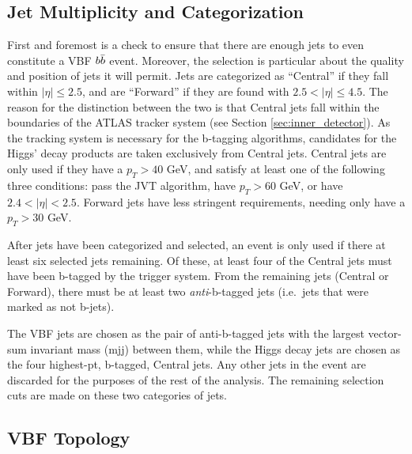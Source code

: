     \subsection{Jet Multiplicity and Categorization}
        
        First and foremost is a check to ensure that there are enough jets to even constitute a VBF \to $b \bar{b}$ event.
        Moreover, the selection is particular about the quality and position of jets it will permit.
        Jets are categorized as ``Central'' if they fall within $|\eta| \leq 2.5$,
            and are ``Forward'' if they are found with $ 2.5 < |\eta| \leq 4.5 $.
        The reason for the distinction between the two is that Central jets fall within the boundaries of the ATLAS tracker system
            (see Section \ref{sec:inner_detector}).
        As the tracking system is necessary for the b-tagging algorithms,
            candidates for the Higgs' decay products are taken exclusively from Central jets.
        Central jets are only used if they have a $p_T > 40$ GeV, and satisfy at least one of the following three conditions:
            pass the JVT algorithm, have $p_T > 60$ GeV, or have $2.4 < |\eta| < 2.5$.
        Forward jets have less stringent requirements, needing only have a $p_T > 30$ GeV.

        After jets have been categorized and selected, an event is only used if there at least six selected jets remaining.
        Of these, at least four of the Central jets must have been b-tagged by the trigger system.
        From the remaining jets (Central or Forward), there must be at least two \textit{anti}-b-tagged jets
            (i.e.\ jets that were marked as not b-jets).

        The VBF jets are chosen as the pair of anti-b-tagged jets with the largest vector-sum invariant mass (mjj) between them,
            while the Higgs decay jets are chosen as the four highest-pt, b-tagged, Central jets.
        Any other jets in the event are discarded for the purposes of the rest of the analysis.
        The remaining selection cuts are made on these two categories of jets.
        


    \subsection{VBF Topology}

